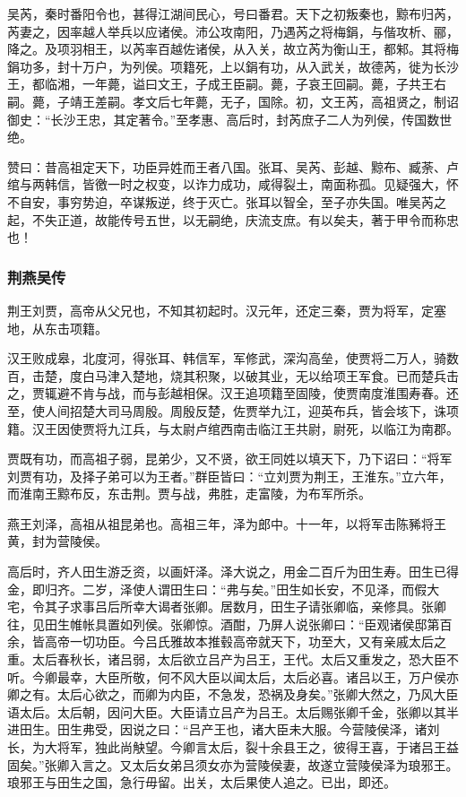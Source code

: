 \documentclass[]{article}
\begin{document}
吴芮，秦时番阳令也，甚得江湖间民心，号曰番君。天下之初叛秦也，黥布归芮，芮妻之，因率越人举兵以应诸侯。沛公攻南阳，乃遇芮之将梅鋗，与偕攻析、郦，降之。及项羽相王，以芮率百越佐诸侯，从入关，故立芮为衡山王，都邾。其将梅鋗功多，封十万户，为列侯。项籍死，上以鋗有功，从入武关，故德芮，徙为长沙王，都临湘，一年薨，谥曰文王，子成王臣嗣。薨，子哀王回嗣。薨，子共王右嗣。薨，子靖王差嗣。孝文后七年薨，无子，国除。初，文王芮，高祖贤之，制诏御史：``长沙王忠，其定著令。''至孝惠、高后时，封芮庶子二人为列侯，传国数世绝。

赞曰：昔高祖定天下，功臣异姓而王者八国。张耳、吴芮、彭越、黥布、臧荼、卢绾与两韩信，皆徼一时之权变，以诈力成功，咸得裂土，南面称孤。见疑强大，怀不自安，事穷势迫，卒谋叛逆，终于灭亡。张耳以智全，至子亦失国。唯吴芮之起，不失正道，故能传号五世，以无嗣绝，庆流支庶。有以矣夫，著于甲令而称忠也！

\hypertarget{header-n3576}{%
\subsubsection{荆燕吴传}\label{header-n3576}}

荆王刘贾，高帝从父兄也，不知其初起时。汉元年，还定三秦，贾为将军，定塞地，从东击项籍。

汉王败成皋，北度河，得张耳、韩信军，军修武，深沟高垒，使贾将二万人，骑数百，击楚，度白马津入楚地，烧其积聚，以破其业，无以给项王军食。已而楚兵击之，贾辄避不肯与战，而与彭越相保。汉王追项籍至固陵，使贾南度淮围寿春。还至，使人间招楚大司马周殷。周殷反楚，佐贾举九江，迎英布兵，皆会垓下，诛项籍。汉王因使贾将九江兵，与太尉卢绾西南击临江王共尉，尉死，以临江为南郡。

贾既有功，而高祖子弱，昆弟少，又不贤，欲王同姓以填天下，乃下诏曰：``将军刘贾有功，及择子弟可以为王者。''群臣皆曰：``立刘贾为荆王，王淮东。''立六年，而淮南王黥布反，东击荆。贾与战，弗胜，走富陵，为布军所杀。

燕王刘泽，高祖从祖昆弟也。高祖三年，泽为郎中。十一年，以将军击陈豨将王黄，封为营陵侯。

高后时，齐人田生游乏资，以画奸泽。泽大说之，用金二百斤为田生寿。田生已得金，即归齐。二岁，泽使人谓田生曰：``弗与矣。''田生如长安，不见泽，而假大宅，令其子求事吕后所幸大谒者张卿。居数月，田生子请张卿临，亲修具。张卿往，见田生帷帐具置如列侯。张卿惊。酒酣，乃屏人说张卿曰：``臣观诸侯邸第百余，皆高帝一切功臣。今吕氏雅故本推毂高帝就天下，功至大，又有亲戚太后之重。太后春秋长，诸吕弱，太后欲立吕产为吕王，王代。太后又重发之，恐大臣不听。今卿最幸，大臣所敬，何不风大臣以闻太后，太后必喜。诸吕以王，万户侯亦卿之有。太后心欲之，而卿为内臣，不急发，恐祸及身矣。''张卿大然之，乃风大臣语太后。太后朝，因问大臣。大臣请立吕产为吕王。太后赐张卿千金，张卿以其半进田生。田生弗受，因说之曰：``吕产王也，诸大臣未大服。今营陵侯泽，诸刘长，为大将军，独此尚觖望。今卿言太后，裂十余县王之，彼得王喜，于诸吕王益固矣。''张卿入言之。又太后女弟吕须女亦为营陵侯妻，故遂立营陵侯泽为琅邪王。琅邪王与田生之国，急行毋留。出关，太后果使人追之。已出，即还。
\end{document}
